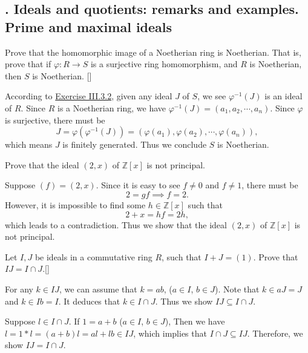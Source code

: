 \documentclass[12pt,letterpaper,boxed]{hmcpset}
\newcommand{\Z}{\mathbb{Z}}
\begin{document}
\subsection{. Ideals and quotients: remarks and examples. Prime and maximal ideals}
\hypertarget{Exercise III.4.2}{}
\begin{problem}[4.2]
Prove that the homomorphic image of a Noetherian ring is Noetherian. That is, prove that if $\varphi: R \to S$ is a surjective ring homomorphism, and $R$ is Noetherian, then $S$ is Noetherian. []
\end{problem}
\begin{solution}
	According to \hyperlink{Exercise III.3.2}{Exercise III.3.2}, given any ideal $J$ of $S$, we see $\varphi^{-1}(J)$ is an ideal of $R$. Since $R$ is a Noetherian ring, we have $\varphi^{-1}(J)=(a_1,a_2,\cdots,a_n)$. Since $\varphi$ is surjective, there must be
	$$
	J=\varphi(\varphi^{-1}(J))=(\varphi(a_1),\varphi(a_2),\cdots,\varphi(a_n)),
	$$
	which means $J$ is finitely generated. Thus we conclude $S$ is Noetherian.
\end{solution}

\begin{problem}[4.3]
	Prove that the ideal $(2, x)$ of $\Z[x]$ is not principal.
\end{problem}
\begin{solution}
	Suppose $(f)=(2,x)$. Since it is easy to see $f\ne 0$ and $f\ne 1$, there must be 
	$$
	2=gf\implies f=2.
	$$ 
	However, it is impossible to find some $h\in \Z[x]$ such that
	\[
	2+x=hf=2h,
	\]
	which leads to a contradiction. Thus we show that the ideal $(2, x)$ of $\Z[x]$ is not principal.
\end{solution}

\hypertarget{Exercise III.4.5}{}
\begin{problem}[4.5]
Let $I, J$ be ideals in a commutative ring $R$, such that $I+J = (1)$. Prove that $IJ = I \cap J$.[]
\end{problem}
\begin{solution}
For any $k\in IJ$, we can assume that $k=ab$, ($a\in I$, $b\in J$). Note that $k\in aJ=J$ and $k\in Ib=I$. It deduces that $k\in I\cap J$. Thus we show $IJ\subseteq I\cap J$.

\noindent Suppose $l\in I\cap J$. If $1=a+b$ ($a\in I$, $b\in J$), Then we have $l=1*l=(a+b)l=al+lb\in IJ$, which implies that $I\cap J\subseteq IJ$. Therefore, we show $IJ = I \cap J$.
\end{solution}
\end{document}
